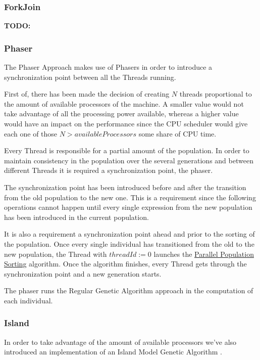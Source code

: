 \documentclass[runningheads]{llncs}
\begin{document}
\subsubsection{ForkJoin} \hfill \par
\textbf{TODO:}

\subsubsection{Phaser} \hfill \par
The Phaser Approach makes use of Phasers in order to introduce a synchronization point between all the Threads running. 

First of, there has been made the decision of creating \(N\) threads proportional to the amount of available processors of the machine. A smaller value would not take advantage of all the processing power available, whereas a higher value would have an impact on the performance since the CPU scheduler would give each one of those \(N > availableProcessors\) some share of CPU time.

Every Thread is responsible for a partial amount of the population. In order to maintain consistency in the population over the several generations and between different Threads it is required a synchronization point, the phaser. 

The synchronization point has been introduced before and after the transition from the old population to the new one. This is a requirement since the following operations cannot happen until  every single expression from the new population has been introduced in the current population.

It is also a requirement a synchronization point ahead and prior to the sorting  of the population. Once every single individual has transitioned from the old to the new population, the Thread with \(threadId := 0\) launches the \hyperref[subsubsec:parallelSort]{Parallel Population Sorting} algorithm. Once the algorithm finishes, every Thread gets through the synchronization point and a new generation starts.

The phaser runs the Regular Genetic Algorithm approach in the computation of each individual.

\subsubsection{Island} \hfill \par
In order to take advantage of the amount of available processors we've also introduced an implementation of an Island Model Genetic Algorithm \cite{islandModelGA}.
\end{document}
